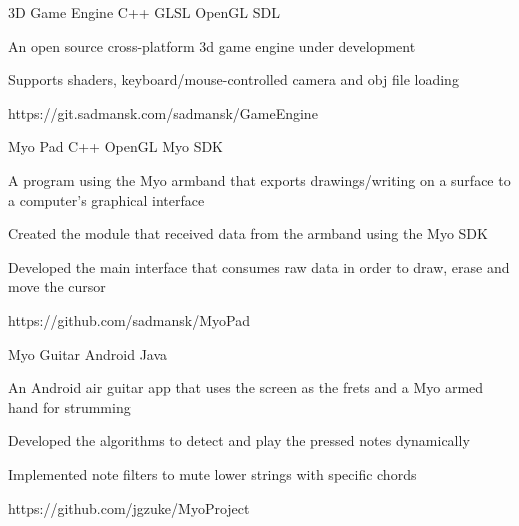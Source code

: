 



\begin{cvprojects}

\cvproject
{3D Game Engine}
{C++ \textbullet{} GLSL \textbullet{} OpenGL \textbullet{} SDL}
{
An open source cross-platform 3d game engine under development
\begin{cvitems}
\item[]
\item {Supports shaders, keyboard/mouse-controlled camera and obj file loading}
\end{cvitems}
}
{https://git.sadmansk.com/sadmansk/GameEngine}


\cvproject
{Myo Pad}
{C++ \textbullet{} OpenGL \textbullet{} Myo SDK}
{
A program using the Myo armband that exports drawings/writing on a surface to a computer's graphical interface 
\begin{cvitems}
\item[]
\item {Created the module that received data from the armband using the Myo SDK}
\item {Developed the main interface that consumes raw data in order to draw, erase and move the cursor}
\end{cvitems}
}
{https://github.com/sadmansk/MyoPad}


\cvproject
{Myo Guitar}
{Android \textbullet{} Java}
{
An Android air guitar app that uses the screen as the frets and a Myo armed hand for strumming
\begin{cvitems}
\item[]
\item {Developed the algorithms to detect and play the pressed notes dynamically}
\item {Implemented note filters to mute lower strings with specific chords}
\end{cvitems}
}
{https://github.com/jgzuke/MyoProject}


\end{cvprojects}
